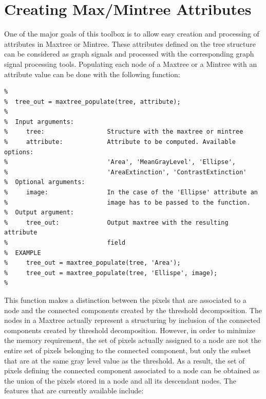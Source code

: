 \documentclass[DIV=calc, paper=a4, fontsize=11pt]{scrartcl}	 %
\begin{document}
\section{Creating Max/Mintree Attributes}
One of the major goals of this toolbox is to allow easy creation and processing of attributes in Maxtree or Mintree. These attributes defined on the tree structure can be considered as graph signals and processed with the corresponding graph signal processing tools. Populating each node of a Maxtree or a Mintree with an attribute value can be done with the following function: 
\begin{lstlisting}[aboveskip=0.5 \baselineskip]
%  maxtree_populate populates a mintree or a maxtree with an attribute.
%
%  tree_out = maxtree_populate(tree, attribute);
%
%  Input arguments:
%     tree:                 Structure with the maxtree or mintree 
%     attribute:            Attribute to be computed. Available options: 
%                           'Area', 'MeanGrayLevel', 'Ellipse',
%                           'AreaExtinction', 'ContrastExtinction'
%  Optional arguments:
%     image:                In the case of the 'Ellipse' attribute an 
%                           image has to be passed to the function.
%  Output argument:
%     tree_out:             Output maxtree with the resulting attribute
%                           field
%  EXAMPLE
%     tree_out = maxtree_populate(tree, 'Area');
%     tree_out = maxtree_populate(tree, 'Ellispe', image);
%
\end{lstlisting}
This function makes a distinction between the pixels that are associated to a node and the connected components created by the threshold decomposition. The nodes in a Maxtree actually represent a structuring by inclusion of the connected components created by threshold decomposition. However, in order to minimize the memory requirement, the set of pixels actually assigned to a node are not the entire set of pixels belonging to the connected component, but only the subset that are at the same gray level value as the threshold. As a result, the set of pixels defining the connected component associated to a node can be obtained as the union of the pixels stored in a node and all its descendant nodes.
The features that are currently available include: 
\end{document}
